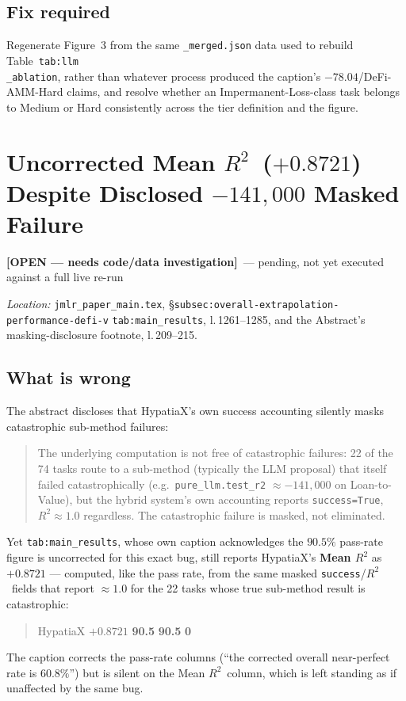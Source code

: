 \documentclass[11pt]{article}
\newcommand{\rtwo}{$R^2$}
\newcommand{\Rsq}{R^{2}}
\newcommand{\open}{\textcolor{red!60!black}{\textbf{[OPEN --- needs code/data investigation]}}}
\newcommand{\loc}[1]{\textit{Location:} #1\par}
\newenvironment{evidence}
  {\begin{quote}\small\ttfamily}
  {\end{quote}}
\begin{document}
\subsection*{Fix required}
Regenerate Figure~3 from the same \texttt{\_merged.json} data used to
rebuild Table~\texttt{tab:llm\\_ablation}, rather than whatever process produced
the caption's $-78.04$/DeFi-AMM-Hard claims, and resolve whether an
Impermanent-Loss-class task belongs to Medium or Hard consistently across
the tier definition and the figure.

\section{Uncorrected Mean \rtwo\ ($+0.8721$) Despite Disclosed $-141{,}000$ Masked Failure}
\label{issue:9}
\open\ --- pending, not yet executed against a full live re-run

\loc{\texttt{jmlr\_paper\_main.tex}, \S\texttt{subsec:overall-extrapolation-performance-defi-v}
\texttt{tab:main\_results}, l.\,1261--1285, and the Abstract's masking-disclosure
footnote, l.\,209--215.}

\subsection*{What is wrong}
The abstract discloses that HypatiaX's own success accounting silently masks
catastrophic sub-method failures:
\begin{evidence}
The underlying computation is not free of catastrophic failures: 22 of the
74 tasks route to a sub-method (typically the LLM proposal) that itself
failed catastrophically (e.g.\ \texttt{pure\_llm.test\_r2} $\approx
-141{,}000$ on Loan-to-Value), but the hybrid system's own accounting
reports \texttt{success=True}, $\Rsq \approx 1.0$ regardless. The
catastrophic failure is masked, not eliminated.
\end{evidence}
Yet \texttt{tab:main\_results}, whose own caption acknowledges the
$90.5\%$ pass-rate figure is uncorrected for this exact bug, still reports
HypatiaX's \textbf{Mean \rtwo} as $+0.8721$ --- computed, like the pass
rate, from the same masked \texttt{success}/\rtwo\ fields that report
$\approx1.0$ for the 22 tasks whose true sub-method result is catastrophic:
\begin{evidence}
HypatiaX  \quad $+0.8721$ \quad \textbf{90.5} \quad \textbf{90.5} \quad \textbf{0}
\end{evidence}
The caption corrects the pass-rate columns (``the corrected overall
near-perfect rate is $60.8\%$'') but is silent on the Mean \rtwo\ column,
which is left standing as if unaffected by the same bug.
\end{document}

